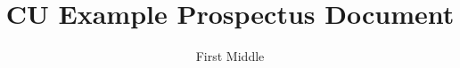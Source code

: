 \documentclass[defaultstyle,11pt]{thesis}
\title{CU Example Prospectus Document}
\author{First Middle}{Last}
\begin{document}
\graphicspath{{\subfix{figures}}}



















\appendix

\end{document}
